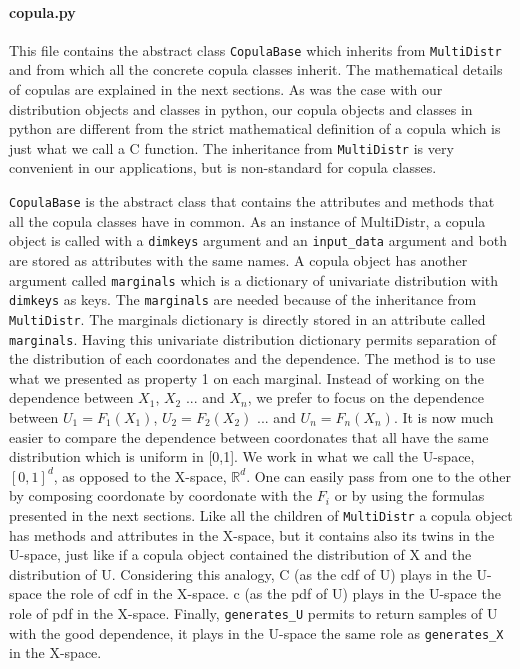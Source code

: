 \documentclass{article}
\begin{document}
	 
	 
	 \paragraph{copula.py}
	 This file contains the abstract class \texttt{CopulaBase} which inherits from \texttt{MultiDistr} and from which all the concrete copula classes inherit. The mathematical details of copulas are explained in the next sections. As was the case with our distribution objects and classes in python, our copula objects and classes in python are different from the strict mathematical definition of a copula which is just what we call a C function. The inheritance from \texttt{MultiDistr} is very convenient in our applications, but is non-standard for copula classes.\newline
	 
	 \texttt{CopulaBase} is the abstract class that contains the attributes and methods that all the copula classes have in common. As an instance of MultiDistr, a copula object is called with a \texttt{dimkeys} argument and an \texttt{input\_data} argument and both are stored as attributes with the same names. A copula object has another argument called \texttt{marginals} which is a dictionary of univariate distribution with \texttt{dimkeys} as keys. The \texttt{marginals} are needed because of the inheritance from \texttt{MultiDistr}. The marginals dictionary is directly stored in an attribute called \texttt{marginals}. Having this univariate distribution dictionary permits separation of the distribution of each coordonates and the dependence. The method is to use what we presented as property 1 on each marginal. Instead of working on the dependence between $X_1$, $X_2$ ... and $X_n$, we prefer to focus on the dependence between $U_1=F_1(X_1)$, $U_2=F_2(X_2)$ ... and $U_n=F_n(X_n)$. It is now much easier to compare the dependence between coordonates that all have the same distribution which is uniform in [0,1]. We work in what we call the U-space, $[0,1]^d$, as opposed to the X-space, $\mathbb{R}^d$. One can easily pass from one to the other by composing coordonate by coordonate with the $F_i$ or by using the formulas presented in the next sections. Like all the children of \texttt{MultiDistr} a copula object has methods and attributes in the X-space, but it contains also its twins in the U-space, just like if a copula object contained the distribution of X and the distribution of U. Considering this analogy, C (as the cdf of U) plays in the U-space the role of cdf in the X-space. c (as the pdf of U) plays in the U-space the role of pdf in the X-space. Finally, \texttt{generates\_U} permits to return samples of U with the good dependence, it plays in the U-space the same role as \texttt{generates\_X} in the X-space.
\end{document}
